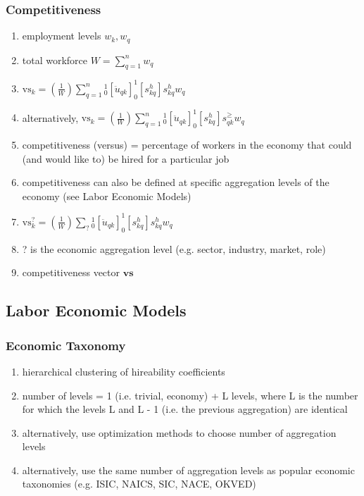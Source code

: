\documentclass{elsarticle} %
\begin{document}
\subsubsection{Competitiveness}
\begin{enumerate}
    \item employment levels $w_k, w_q$
    \item total workforce $W = \sum_{q=1}^{n}{w_q}$
    \item $\text{vs}_k = \left(\frac{1}{W}\right) \sum_{q=1}^{n}{_{0}^{1}[\ddot{u}_{qk}] _{0}^{1}[s_{kq}^{h}] s_{kq}^{h} w_q}$
    \item alternatively, $\text{vs}_k = \left(\frac{1}{W}\right)
              \sum_{q=1}^{n}{_{0}^{1}[\ddot{u}_{qk}] _{0}^{1}[s_{kq}^{h}] s_{qk}^{\geq}
              w_q}$
    \item competitiveness (versus) = percentage of workers in the economy that could (and
          would like to) be hired for a particular job
    \item competitiveness can also be defined at specific aggregation levels of the
          economy (see Labor Economic Models)
    \item $\text{vs}_{k}^{?} = \left(\frac{1}{W}\right) \sum_{?}{_{0}^{1}[\ddot{u}_{qk}] _{0}^{1}[s_{kq}^{h}] s_{kq}^{h} w_q}$
    \item ? is the economic aggregation level (e.g. sector, industry, market, role)
    \item competitiveness vector $\textbf{vs}$
\end{enumerate}

\subsection{Labor Economic Models}
\subsubsection{Economic Taxonomy}
\begin{enumerate}
    \item hierarchical clustering of hireability coefficients
    \item number of levels = 1 (i.e. trivial, economy) + L levels, where L is the number
          for which the levels L and L - 1 (i.e. the previous aggregation) are identical
    \item alternatively, use optimization methods to choose number of aggregation levels
    \item alternatively, use the same number of aggregation levels as popular economic
          taxonomies (e.g. ISIC, NAICS, SIC, NACE, OKVED)
\end{enumerate}
\end{document}
